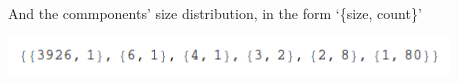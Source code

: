 \documentclass[a4paper, 12pt]{mcshw}
\begin{document}
\begin{enumerate}
\begin{solution}
\begin{center}
            \end{center}
            And the commponents' size distribution, in the form `\{size, count\}'
            \begin{center}
                \includegraphics[height=1cm]{3.png}
            \end{center}
        \end{solution}
\end{enumerate}
\end{document}
